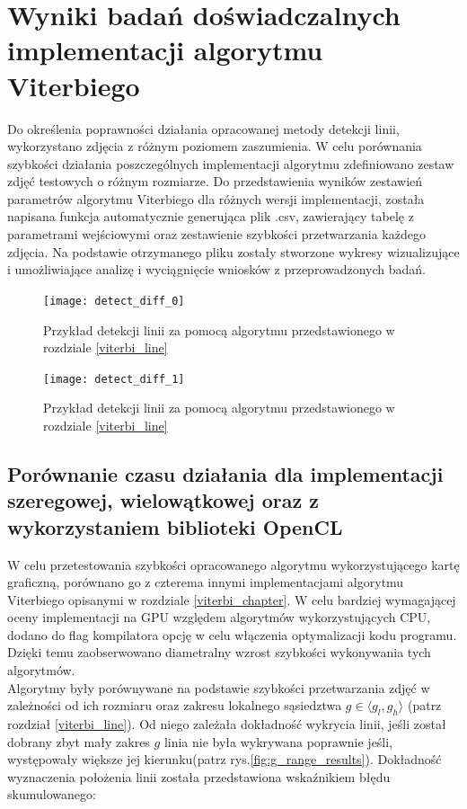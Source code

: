 \documentclass[document.tex]{subfiles}
\begin{document}
\chapter{Wyniki badań doświadczalnych \\ implementacji algorytmu Viterbiego}
\indent Do określenia poprawności działania opracowanej metody detekcji linii, 
wykorzystano zdjęcia z różnym poziomem zaszumienia. W celu porównania szybkości
działania poszczególnych implementacji algorytmu zdefiniowano zestaw zdjęć testowych
o różnym rozmiarze. Do przedstawienia wyników zestawień parametrów algorytmu Viterbiego
dla różnych wersji implementacji, została napisana funkcja automatycznie generująca plik .csv,
zawierający tabelę z parametrami wejściowymi oraz zestawienie szybkości przetwarzania każdego zdjęcia.
Na podstawie otrzymanego pliku zostały stworzone wykresy wizualizujące i umożliwiające
analizę i wyciągnięcie wniosków z przeprowadzonych badań.

\begin{figure}[h]
\texttt{[image: detect\_diff\_0]}
\caption{Przykład detekcji linii za pomocą algorytmu przedstawionego w rozdziale \ref{viterbi_line}}
\label{fig:sample_detect_0}
\end{figure}

\clearpage

\begin{figure}[h]
\texttt{[image: detect\_diff\_1]}
\caption{Przykład detekcji linii za pomocą algorytmu przedstawionego w rozdziale \ref{viterbi_line}}
\label{fig:sample_detect_1}
\end{figure}

\section{Porównanie czasu działania dla implementacji szeregowej, wielowątkowej
oraz z wykorzystaniem biblioteki OpenCL}
\indent W celu przetestowania szybkości opracowanego algorytmu wykorzystującego
kartę graficzną, porównano go z czterema innymi implementacjami algorytmu Viterbiego opisanymi
w rozdziale \ref{viterbi_chapter}.
W celu bardziej wymagającej oceny implementacji na GPU względem algorytmów wykorzystujących CPU, dodano
do flag kompilatora opcję  w celu włączenia optymalizacji kodu programu.
Dzięki temu zaobserwowano diametralny wzrost szybkości wykonywania tych algorytmów.
\\
\indent Algorytmy były porównywane na podstawie szybkości przetwarzania zdjęć
w zależności od ich rozmiaru oraz zakresu lokalnego sąsiedztwa $g\in \langle g_l, g_h \rangle$
(patrz rozdział \ref{viterbi_line}). Od niego zależała dokładność wykrycia linii, 
jeśli został dobrany zbyt mały zakres $g$ linia nie była wykrywana poprawnie jeśli, 
występowały większe jej kierunku(patrz rys.\ref{fig:g_range_results}). Dokładność wyznaczenia położenia linii
została przedstawiona wskaźnikiem błędu skumulowanego:
\end{document}
